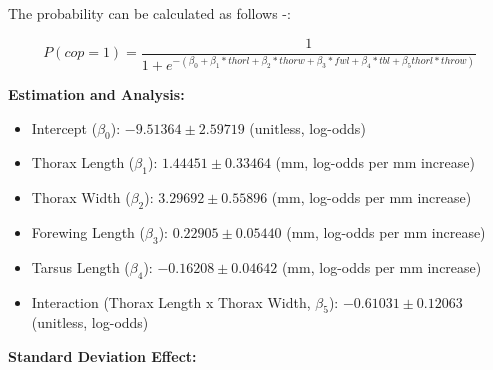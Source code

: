 \documentclass[
]{article}
\providecommand{\tightlist}{%
  \setlength{\itemsep}{0pt}\setlength{\parskip}{0pt}}
\begin{document}
The probability can be calculated as follows -:

\[
P(cop=1) = \frac{1}{1 + e^{-(\beta_0 + \beta_1*thorl + \beta_2*thorw + \beta_3*fwl + \beta_4*tbl + \beta_5{thorl*throw})}}
\]

\textbf{Estimation and Analysis:}

\begin{itemize}
\tightlist
\item
  Intercept (\(\beta_0\)): \(-9.51364 \pm 2.59719\) (unitless, log-odds)
\item
  Thorax Length (\(\beta_1\)): \(1.44451 \pm 0.33464\) (mm, log-odds per
  mm increase)
\item
  Thorax Width (\(\beta_2\)): \(3.29692 \pm 0.55896\) (mm, log-odds per
  mm increase)
\item
  Forewing Length (\(\beta_3\)): \(0.22905 \pm 0.05440\) (mm, log-odds
  per mm increase)
\item
  Tarsus Length (\(\beta_4\)): \(-0.16208 \pm 0.04642\) (mm, log-odds
  per mm increase)
\item
  Interaction (Thorax Length x Thorax Width, \(\beta_5\)):
  \(-0.61031 \pm 0.12063\) (unitless, log-odds)
\end{itemize}

\textbf{Standard Deviation Effect:}
\end{document}
